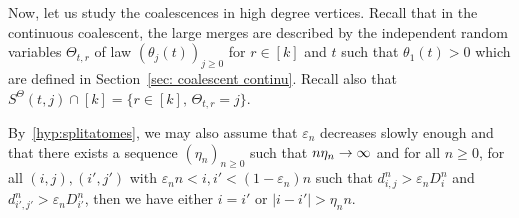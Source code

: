 \documentclass[AHL,Unicode,published]{cedram}
\newcommand{\e}{\varepsilon}
\newcommand{\1}{\mathbbm{1}}
\renewcommand*{\to}{\mathchoice{\longrightarrow}{\rightarrow}{\rightarrow}{\rightarrow}}
\begin{document}
Now, let us study the coalescences in high degree vertices. Recall that in the continuous coalescent, the large merges are described by the independent random variables $\Theta_{t,r}$ of law $(\theta_j(t))_{j\ge 0}$ for $r \in [k]$ and $t$ such that $\theta_1(t)>0$ which are defined in Section~\ref{sec: coalescent continu}. Recall also that $S^\Theta(t,j)\cap [k]= \{ r \in [k], \, \Theta_{t,r} = j\} $.

By~\ref{hyp:splitatomes}, we may also assume that $\e_n$ decreases slowly enough and that there exists a sequence $(\eta_n)_{n \ge 0}$ such that $n \eta_n \to \infty$ and for all $n \ge 0$, for all $(i,j),(i',j')$ with $\e_n n < i,i' < (1-\e_n) n$ such that $d^n_{i,j} > \e_n D^n_i$ and $d^n_{i',j'} > \e_n D^n_{i'}$, then we have either $i=i'$ or $| i-i' | > \eta_n n$.
\end{document}
